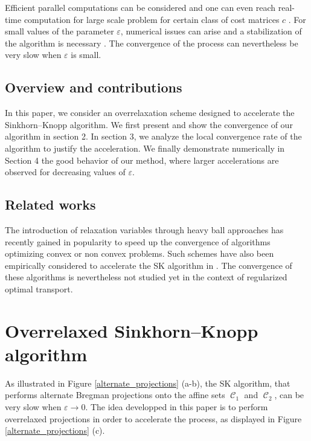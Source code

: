 \documentclass{article} %
\DeclareMathOperator{\Ccal}{\mathcal{C}}
\renewcommand{\epsilon}{\varepsilon}
\theoremstyle{plain}
\theoremstyle{definition}
\theoremstyle{remark}
\begin{document}
Efficient parallel computations can be considered \cite{cuturi13} and one can even reach real-time computation for large scale problem for certain class of cost matrices $c$ \cite{Solomon2015}. 
For small values of the parameter $\epsilon$, numerical issues can arise and a stabilization of the algorithm is necessary \cite{2016arXiv160705816C}.
The convergence of the process can nevertheless be very slow when $\epsilon$ is small.

\subsection{Overview and contributions}
In this paper, we consider an overrelaxation scheme designed to accelerate the Sinkhorn--Knopp algorithm. We first present and show the convergence of our algorithm in section 2. In section 3, we analyze the local convergence rate of the algorithm to justify the acceleration.
We finally demonstrate numerically  in Section 4 the good behavior of our method, where larger accelerations are observed for decreasing values of $\epsilon$.

\subsection{Related works }
The introduction of relaxation variables through heavy ball approaches \cite{POLYAK19641} has recently gained in popularity  to speed up the convergence of algorithms optimizing convex \cite{2014arXiv1412.7457G} or non convex \cite{Zavriev1993,2016arXiv160609070O} problems. Such schemes have also been empirically considered to accelerate the SK algorithm  in \cite{peyre2016quantum,2017arXiv170801955S}. The convergence of these algorithms is nevertheless not studied yet in the context of regularized optimal transport.


\section{Overrelaxed Sinkhorn--Knopp algorithm}

As illustrated in Figure \ref{alternate_projections} (a-b), the SK algorithm, that  performs alternate Bregman projections onto the affine sets $\Ccal_1$ and $\Ccal_2$, can be very slow when $\epsilon\to 0$. The idea developped in this paper is to perform overrelaxed projections in order to accelerate the process, as displayed in Figure \ref{alternate_projections} (c).
\end{document}
